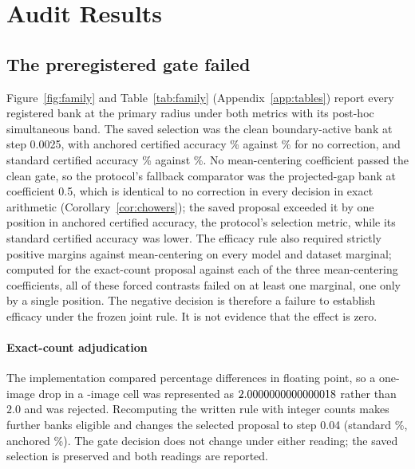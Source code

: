 \section{Audit Results}
\label{sec:results}



\subsection{The preregistered gate failed}
\label{sec:gate}

Figure~\ref{fig:family} and Table~\ref{tab:family} (Appendix~\ref{app:tables})
report every registered bank at the primary radius under both metrics with its
post-hoc simultaneous band. The saved selection was
the clean boundary-active bank at step 0.0025, with anchored certified accuracy
\SavedAnchCA\% against \NoCorrAnchCA\% for no correction, and standard
certified accuracy \SavedStdCA\% against \NoCorrStdCA\%. No mean-centering
coefficient passed the clean gate, so the protocol's fallback comparator was
the projected-gap bank at coefficient 0.5, which is identical to no correction
in every decision in exact arithmetic (Corollary~\ref{cor:chowers}); the saved proposal exceeded it
by one position in anchored certified accuracy, the protocol's selection metric,
while its standard certified accuracy was lower. The efficacy rule also required strictly positive margins
against mean-centering on every model and dataset marginal; computed for the
exact-count proposal against each of the three mean-centering coefficients,
all \ForcedComparisonFailures{} of these forced contrasts failed on at least one
marginal, one only by a single position. The negative decision is therefore a failure
to establish efficacy under the frozen joint rule. It is not evidence that the
effect is zero.

\paragraph{Exact-count adjudication}
The implementation compared percentage differences in floating point, so a
one-image drop in a \ExpEurosatItemsPerCell-image cell was represented as
$2.0000000000000018$ rather than $2.0$ and was rejected. Recomputing the written
rule with integer counts makes \FloatGateRejectedCandidates{} further banks
eligible and changes the selected proposal to step 0.04 (standard
\ExactStdCA\%, anchored \ExactAnchCA\%). The gate decision does not change under
either reading; the saved selection is preserved and both readings are reported.

